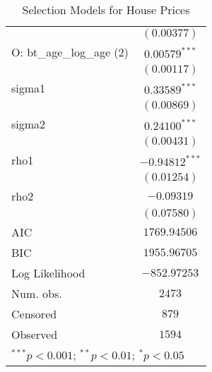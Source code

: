 \begin{table}
\begin{center}
\begin{tiny}
\begin{tabular}{l c}
                                  & $(0.00377)$      \\
O: bt\_age\_log\_age (2)          & $0.00579^{***}$  \\
                                  & $(0.00117)$      \\
sigma1                            & $0.33589^{***}$  \\
                                  & $(0.00869)$      \\
sigma2                            & $0.24100^{***}$  \\
                                  & $(0.00431)$      \\
rho1                              & $-0.94812^{***}$ \\
                                  & $(0.01254)$      \\
rho2                              & $-0.09319$       \\
                                  & $(0.07580)$      \\
\hline
AIC                               & $1769.94506$     \\
BIC                               & $1955.96705$     \\
Log Likelihood                    & $-852.97253$     \\
Num. obs.                         & $2473$           \\
Censored                          & $879$            \\
Observed                          & $1594$           \\
\hline
\multicolumn{2}{l}{\tiny{$^{***}p<0.001$; $^{**}p<0.01$; $^{*}p<0.05$}}
\end{tabular}
\end{tiny}
\caption{Selection Models for House Prices}
\label{tab:tobit_5_sel}
\end{center}
\end{table}
